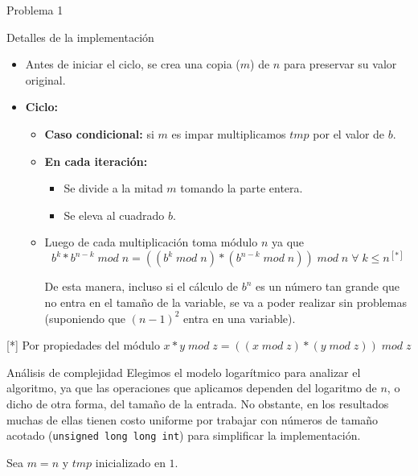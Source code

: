 \begin{section}{Problema 1}
\begin{subsection}{Detalles de la implementación}
\begin{itemize}
			\item Antes de iniciar el ciclo, se crea una copia ($m$) de $n$ para preservar su valor original.

			\item \textbf{Ciclo:}
			\begin{itemize}
				
				\item \textbf{Caso condicional:} si $m$ es impar multiplicamos $tmp$ por el valor de $b$.
				
				\item \textbf{En cada iteración:}
				\begin{itemize}
					\item Se divide a la mitad $m$ tomando la parte entera.
					\item Se eleva al cuadrado $b$.
				\end{itemize}

				\item Luego de cada multiplicación toma módulo $n$ ya que
				$$b^k * b^{n-k}\; mod\;n = ((b^k\;mod\;n)*(b^{n-k}\;mod\;n))\;mod\;n\;\forall\;k\leq n ^{[*]}$$ 
	
				De esta manera, incluso si el cálculo de $b^n$ es un número tan grande que no entra en el 
				tamaño de la variable, se va a poder realizar sin problemas (suponiendo que $(n-1)^2$ entra 
				en una variable).

			\end{itemize}
		\end{itemize}
		
		\vspace{0.5cm}
		{\footnotesize [*] Por propiedades del módulo $x*y\; mod \; z = ((x\; mod\; z)*(y\; mod\; z))\;mod\; z$ } \\
		
	\end{subsection}



	\begin{subsection}{Análisis de complejidad}
		Elegimos el modelo logarítmico para analizar el algoritmo, ya que las operaciones que aplicamos dependen del logaritmo de $n$, o dicho de otra forma, del tamaño de la entrada. No obstante, en los resultados muchas de ellas tienen costo uniforme por trabajar con números de tamaño acotado (\texttt{unsigned long long int}) para simplificar la implementación.\Pa

		Sea $m = n$ y $tmp$ inicializado en $1$.\\


\end{subsection}
\end{section}

